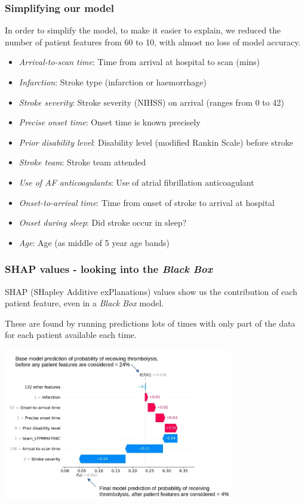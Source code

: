 \documentclass{beamer}
\begin{document}

\begin{frame}
\frametitle{Simplifying our model}

In order to simplify the model, to make it easier to explain, we reduced the number of patient features from 60 to 10, with almost no loss of model accuracy.

\small
\begin{itemize}
    \item \emph{Arrival-to-scan time}: Time from arrival at hospital to scan (mins)
    \item \emph{Infarction}: Stroke type (infarction or haemorrhage)
    \item \emph{Stroke severity}: Stroke severity (NIHSS) on arrival (ranges from 0 to 42)
    \item \emph{Precise onset time}: Onset time is known precisely
    \item \emph{Prior disability level}: Disability level (modified Rankin Scale) before stroke
    \item \emph{Stroke team}: Stroke team attended
    \item \emph{Use of AF anticoagulants}: Use of atrial fibrillation anticoagulant
    \item \emph{Onset-to-arrival time}: Time from onset of stroke to arrival at hospital
    \item \emph{Onset during sleep}: Did stroke occur in sleep?
    \item \emph{Age}: Age (as middle of 5 year age bands)
\end{itemize}
\end{frame}


\begin{frame}
\frametitle{SHAP values - looking into the \emph{Black Box}}

SHAP (SHapley Additive exPlanations) values show us the contribution of each patient feature, even in a \emph{Black Box} model.

\vspace{2mm}
These are found by running predictions lots of times with only part of the data for each patient available each time.


\begin{center}
\includegraphics[width=0.75\textwidth]{./images/xgb_waterfall_low_probability_2}
\end{center}
\end{frame}
\end{document}
